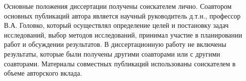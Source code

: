 \begin{enumerate}[wide, labelindent=10mm]
\end{enumerate}

\vspace{3mm}
\contribution
\vspace{3mm}

Основные положения диссертации получены соискателем лично. Соавтором основных публикаций автора является научный руководитель д.т.н., профессор В.А. Головко, который осуществлял определение целей и постановку задач исследований, выбор методов исследований, принимал участие в планировании работ и обсуждении результатов. В диссертационную работу не включены результаты, которые были получены другими соавторами или с другими соавторами. Материалы совместных публикаций использованы соискателем в объеме авторского вклада.

\vspace{3mm}
\probation
\vspace{3mm}

